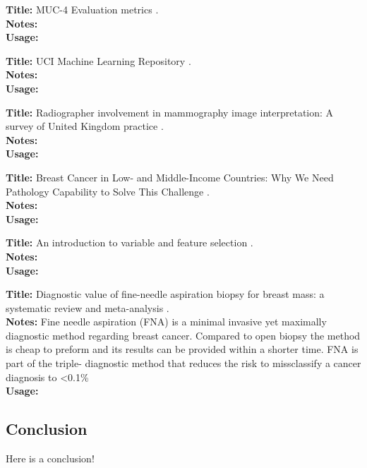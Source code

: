 \documentclass[a4paper]{article}
\begin{document}
\noindent
\textbf{Title:} MUC-4 Evaluation metrics \cite{muc1992}.
\\
\textbf{Notes:}
\\
\textbf{Usage:}
\\\par

\noindent
\textbf{Title:} {UCI} Machine Learning Repository \cite{dua:2017}.
\\
\textbf{Notes:}
\\
\textbf{Usage:}
\\\par

\noindent
\textbf{Title:} Radiographer involvement in mammography image interpretation: A survey of United Kingdom practice \cite{culpan2016}.
\\
\textbf{Notes:}
\\
\textbf{Usage:}
\\\par

\noindent
\textbf{Title:} Breast Cancer in Low- and Middle-Income Countries: Why We Need Pathology Capability to Solve This Challenge \cite{martei2018}.
\\
\textbf{Notes:}
\\
\textbf{Usage:}
\\\par

\noindent
\textbf{Title:} An introduction to variable and feature selection \cite{guyon2003}.
\\
\textbf{Notes:}
\\
\textbf{Usage:}
\\\par

\noindent
\textbf{Title:} Diagnostic value of fine-needle aspiration biopsy for breast mass: a systematic review and meta-analysis \cite{Yu2012}.
\\
\textbf{Notes:} Fine needle aspiration (FNA) is a minimal invasive yet maximally diagnostic method regarding breast cancer. Compared to open biopsy the method is cheap to preform and its results can be provided within a shorter time. FNA is part of the triple- diagnostic method that reduces the risk to missclassify a cancer diagnosis to \textless 0.1\%
\\
\textbf{Usage:}
\\\par



\subsection{Conclusion}

Here is a conclusion!



\end{document}

